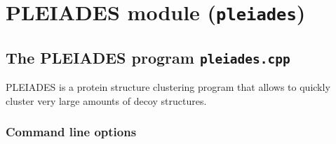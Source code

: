 \chapter{PLEIADES module (\texttt{pleiades})}
\label{cha:pleiades-module}

\section{The PLEIADES program \texttt{pleiades.cpp}}
\label{sec:pleiades-executable}

PLEIADES is a protein structure clustering program that allows to quickly
cluster very large amounts of decoy structures.

\subsection{Command line options}

